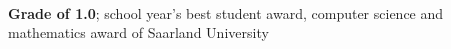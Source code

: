\documentclass[]{lukas-cv-openfont}
\begin{document}
\noindent
{}
\\
\begin{tightitemize}{1.7em}
	\item \textbf{Grade of 1.0}; school year's best student award, computer science and mathematics award of Saarland University
\end{tightitemize}
\sectionsep
\end{document}

